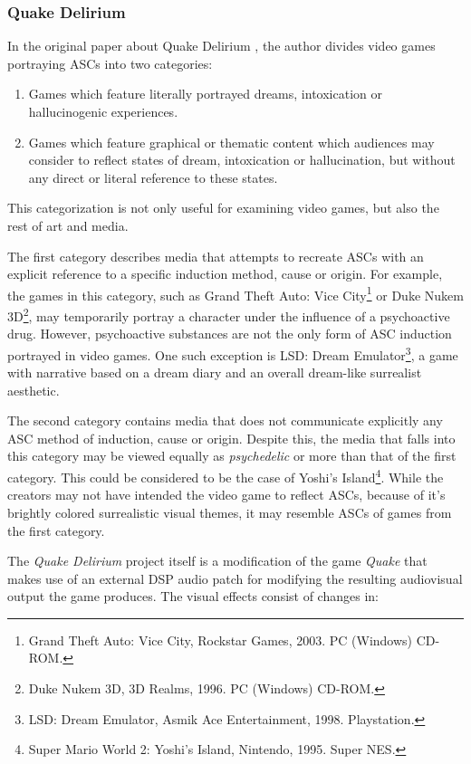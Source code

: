 \subsubsection{Quake Delirium}
In the original paper about Quake Delirium \autocite{weinel2011quake}, the author divides video games portraying \acp{ASC} into two categories:

\begin{enumerate}
    \item Games which feature literally portrayed dreams, intoxication or hallucinogenic experiences.
    \item Games which feature graphical or thematic content which audiences may consider to reflect states of dream, intoxication or hallucination, but without any direct or literal reference to these states.
\end{enumerate}

This categorization is not only useful for examining video games, but also the rest of art and media.

The first category describes media that attempts to recreate \acp{ASC} with an explicit reference to a specific induction method, cause or origin. For example, the games in this category, such as {Grand Theft Auto: Vice City}\footnote{Grand Theft Auto: Vice City, Rockstar Games, 2003. PC (Windows) CD-ROM.} or {Duke Nukem 3D}\footnote{Duke Nukem 3D, 3D Realms, 1996. PC (Windows)
CD-ROM.}, may temporarily portray a character under the influence of a psychoactive drug. However, psychoactive substances are not the only form of \ac{ASC} induction portrayed in video games. One such exception is {LSD: Dream Emulator}\footnote{LSD: Dream Emulator, Asmik Ace Entertainment, 1998. Playstation.}, a game with narrative based on a dream diary and an overall dream-like surrealist aesthetic.

The second category contains media that does not communicate explicitly any \ac{ASC} method of induction, cause or origin. Despite this, the media that falls into this category may be viewed equally as \textit{psychedelic} or more than that of the first category. This could be considered to be the case of {Yoshi's Island}\footnote{Super Mario World 2: Yoshi’s Island, Nintendo, 1995. Super NES.}. While the creators may not have intended the video game to reflect \acp{ASC}, because of it's brightly colored surrealistic visual themes, it may resemble \acp{ASC} of games from the first category.

The \textit{Quake Delirium} project itself is a modification of the game \textit{Quake} that makes use of an external \ac{DSP} audio patch for modifying the resulting audiovisual output the game produces. The visual effects consist of changes in:

